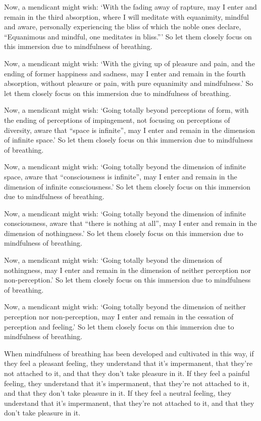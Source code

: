 \documentclass[12pt,openany]{book}%
\begin{document}
Now, a mendicant might wish: ‘With the fading away of rapture, may I enter and remain in the third absorption, where I will meditate with equanimity, mindful and aware, personally experiencing the bliss of which the noble ones declare, “Equanimous and mindful, one meditates in bliss.”’ So let them closely focus on this immersion due to mindfulness of breathing. 

Now, a mendicant might wish: ‘With the giving up of pleasure and pain, and the ending of former happiness and sadness, may I enter and remain in the fourth absorption, without pleasure or pain, with pure equanimity and mindfulness.’ So let them closely focus on this immersion due to mindfulness of breathing. 

Now, a mendicant might wish: ‘Going totally beyond perceptions of form, with the ending of perceptions of impingement, not focusing on perceptions of diversity, aware that “space is infinite”, may I enter and remain in the dimension of infinite space.’ So let them closely focus on this immersion due to mindfulness of breathing. 

Now, a mendicant might wish: ‘Going totally beyond the dimension of infinite space, aware that “consciousness is infinite”, may I enter and remain in the dimension of infinite consciousness.’ So let them closely focus on this immersion due to mindfulness of breathing. 

Now, a mendicant might wish: ‘Going totally beyond the dimension of infinite consciousness, aware that “there is nothing at all”, may I enter and remain in the dimension of nothingness.’ So let them closely focus on this immersion due to mindfulness of breathing. 

Now, a mendicant might wish: ‘Going totally beyond the dimension of nothingness, may I enter and remain in the dimension of neither perception nor non-perception.’ So let them closely focus on this immersion due to mindfulness of breathing. 

Now, a mendicant might wish: ‘Going totally beyond the dimension of neither perception nor non-perception, may I enter and remain in the cessation of perception and feeling.’ So let them closely focus on this immersion due to mindfulness of breathing. 

When mindfulness of breathing has been developed and cultivated in this way, if they feel a pleasant feeling, they understand that it’s impermanent, that they’re not attached to it, and that they don’t take pleasure in it. If they feel a painful feeling, they understand that it’s impermanent, that they’re not attached to it, and that they don’t take pleasure in it. If they feel a neutral feeling, they understand that it’s impermanent, that they’re not attached to it, and that they don’t take pleasure in it. 
\end{document}
